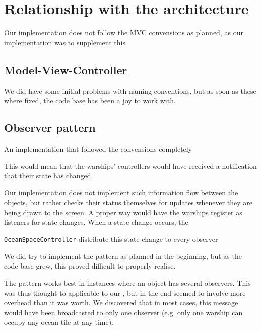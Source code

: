 \chapter{Relationship with the architecture}



Our implementation does not follow the MVC convensions as planned, as our implementation was to supplement this 


\section{Model-View-Controller}



We did have some initial problems with naming conventions, but as soon as these where fixed, the code base has been a joy to work with.



\section{Observer pattern}

An implementation that followed the convensions completely

This would mean that the warships' controllers would have received a notification that their state has changed.

Our implementation does not implement such information flow between the objects, but rather checks their status themselves for updates whenever they are being drawn to the screen.
A proper way would have the warships register as listeners for state changes. When a state change occurs, the 

\texttt{OceanSpaceController} distribute this state change to every observer

We did try to implement the pattern as planned in the beginning, but as the code base grew, this proved difficult to properly realise.

The pattern works best in instances where an object has several observers. This was thus thought to applicable to our 
, but in the end seemed to involve more overhead than it was worth. We discovered that in most cases, this message would have been broadcasted to only one observer (e.g. only one warship can occupy any ocean tile at any time).

